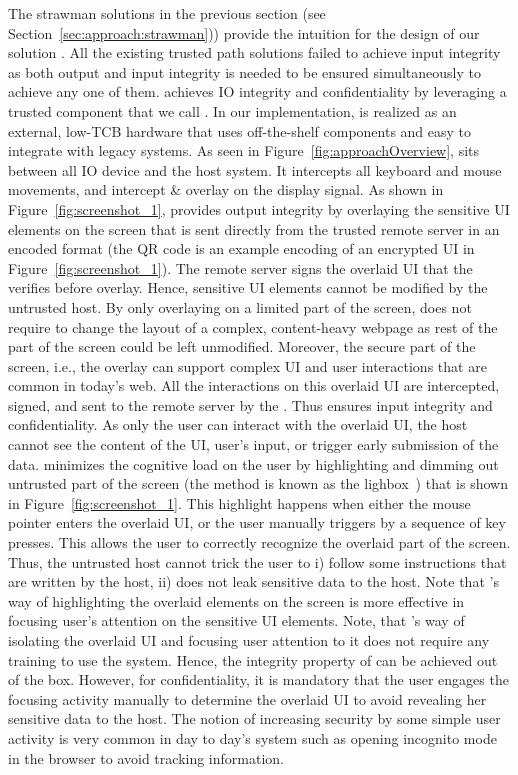  The strawman solutions in the previous section (see Section~\ref{sec:approach:strawman})) provide the intuition for the design of our solution \name. All the existing trusted path solutions failed to achieve input integrity as both output and input integrity is needed to be ensured simultaneously to achieve any one of them. \name achieves IO integrity and confidentiality by leveraging a trusted component that we call \device. In our implementation, \device is realized as an external, low-TCB hardware that uses off-the-shelf components and easy to integrate with legacy systems. As seen in Figure~\ref{fig:approachOverview}, \device sits between all IO device and the host system. It intercepts all keyboard and mouse movements, and intercept \& overlay on the display signal. As shown in Figure~\ref{fig:screenshot_1}, \name provides output integrity by overlaying the sensitive UI elements on the screen that is sent directly from the trusted remote server in an encoded format (the QR code is an example encoding of an encrypted UI in Figure~\ref{fig:screenshot_1}). The remote server signs the overlaid UI that the \device verifies before overlay. Hence, sensitive UI elements cannot be modified by the untrusted host. By only overlaying on a limited part of the screen, \name does not require to change the layout of a complex, content-heavy webpage as rest of the part of the screen could be left unmodified.
Moreover, the secure part of the screen, i.e., the overlay can support complex UI and user interactions that are common in today's web. All the interactions on this overlaid UI are intercepted, signed, and sent to the remote server by the \device. Thus \name ensures input integrity and confidentiality. As only the user can interact with the overlaid UI, the host cannot see the content of the UI, user's input, or trigger early submission of the data.
\name minimizes the cognitive load on the user by highlighting and dimming out untrusted part of the screen (the method is known as the lighbox~\cite{huang2012clickjacking}) that is shown in Figure~\ref{fig:screenshot_1}. This highlight happens when either the mouse pointer enters the overlaid UI, or the user manually triggers by a sequence of key presses. This allows the user to correctly recognize the overlaid part of the screen. Thus, the untrusted host cannot trick the user to i) follow some instructions that are written by the host, ii) does not leak sensitive data to the host. Note that \name's way of highlighting the overlaid elements on the screen is more effective in focusing user's attention on the sensitive UI elements. Note, that \name's way of isolating the overlaid UI and focusing user attention to it does not require any training to use the system. Hence, the integrity property of \name can be achieved out of the box. However, for confidentiality, it is mandatory that the user engages the focusing activity manually to determine the overlaid UI to avoid revealing her sensitive data to the host. The notion of increasing security by some simple user activity is very common in day to day's system such as opening incognito mode in the browser to avoid tracking information.
